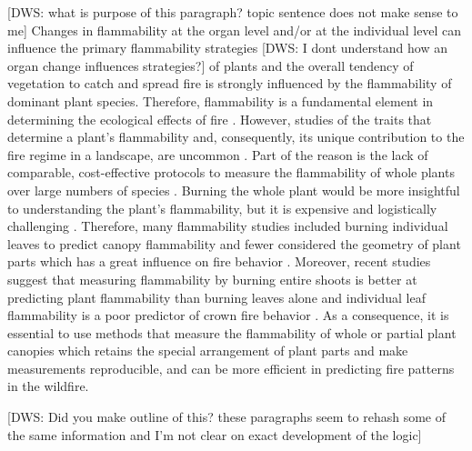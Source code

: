\documentclass[12pt]{report}
\begin{document}
[DWS: what is purpose of this paragraph? topic sentence does not make sense to me] Changes in flammability at the organ level and/or at the individual level can influence the primary flammability strategies [DWS: I dont understand how an organ change influences strategies?] of plants \citep{pausas2017flammability} and the overall tendency of vegetation to catch and spread fire is strongly influenced by the flammability of dominant plant species. Therefore, flammability is a fundamental element in determining the ecological effects of fire \citep{bond1995kill, lavorel2002predicting, bond2005fire}. However, studies of the traits that determine a plant's flammability and, consequently, its unique contribution to the fire regime in a landscape, are uncommon \citep{schwilk2015dimensions, pausas2017flammability}. Part of the reason is the lack of comparable, cost-effective protocols to measure the flammability of whole plants over large numbers of species \citep{jaureguiberry2011device}. Burning the whole plant would be more insightful to understanding the plant's flammability, but it is expensive and logistically challenging \citep{jaureguiberry2011device, pausasandmoi2012flammability}. Therefore, many flammability studies included burning individual leaves to predict canopy flammability and fewer considered the geometry of plant parts which has a great influence on fire behavior \citep{schwilk2003flammability, gao2018grass, calitz2015investigating,pausas2012fires}. Moreover, recent studies suggest that measuring flammability by burning entire shoots is better at predicting plant flammability than burning leaves alone \citep{alam2020shoot} and individual leaf flammability is a poor predictor of crown fire behavior \citep{fernandes2012plant}. As a consequence, it is essential to use methods that measure the flammability of whole or partial plant canopies which retains the special arrangement of plant parts and make measurements reproducible, and can be more efficient in predicting fire patterns in the wildfire.

[DWS: Did you make outline of this? these paragraphs seem to rehash some of the same information and I'm not clear on exact development of the logic]
\end{document}
